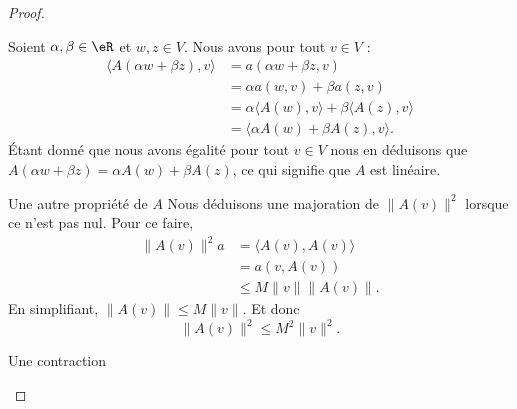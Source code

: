 \begin{proof}
\begin{subproof}
                Soient \( \alpha,\beta\in \eR\) et \( w,z\in V\). Nous avons pour tout \( v\in V\) :
                \begin{subequations}
                    \begin{align}
                        \langle  A(\alpha w+\beta z), v\rangle &=a(\alpha w+\beta z,v)\\
                        &=\alpha a(w,v)+\beta a(z,v)\\
                        &=\alpha\langle A(w), v\rangle +\beta\langle A(z), v\rangle \\
                        &=\langle \alpha A(w)+\beta A(z), v\rangle .
                    \end{align}
                \end{subequations}
                Étant donné que nous avons égalité pour tout \( v\in V\) nous en déduisons que \( A(\alpha w+\beta z)=\alpha A(w)+\beta A(z)\), ce qui signifie que \( A \) est linéaire.
            \item[Une autre propriété de \( A\) ]
                Nous déduisons une majoration de \( \| A(v) \|^2\) lorsque ce n'est pas nul. Pour ce faire,
                \begin{subequations}
                    \begin{align}
                        \| A(v) \|^2a&=\langle A(v), A(v)\rangle \\
                        &=a(v,A(v))\\
                        &\leq M\| v \|\| A(v) \|.
                    \end{align}
                \end{subequations}
                En simplifiant, \( \| A(v) \|\leq M\| v \|\). Et donc
                \begin{equation}        \label{EQooBQAHooAZRdAW}
                    \| A(v) \|^2\leq M^2\| v \|^2.
                \end{equation}
            \item[Une contraction]


\end{subproof}
\end{proof}
